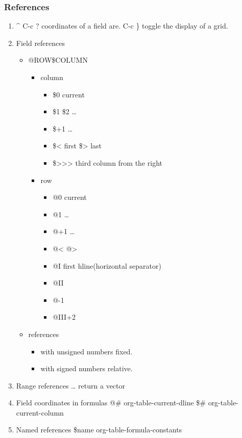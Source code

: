 \documentclass[11pt]{article}
\begin{document}
\subsubsection{References}
\label{sec:org9e89aeb}
\begin{enumerate}
\item \^{}
\label{sec:orgaf18a6f}
C-c ?  coordinates of a field are.
C-c \}  toggle the display of a grid.
\item Field references
\label{sec:org91fe00d}
\begin{itemize}
\item @ROW\$COLUMN
\begin{itemize}
\item column
\begin{itemize}
\item \$0 current
\item \$1 \$2 \ldots{}
\item \$+1 \ldots{}
\item \$< first \$> last
\item \$>>> third column from the right
\end{itemize}
\item row
\begin{itemize}
\item @0 current
\item @1 \ldots{}
\item @+1 \ldots{}
\item @< @>
\item @I first hline(horizontal separator)
\item @II
\item @-1
\item @III+2
\end{itemize}
\end{itemize}
\item references
\begin{itemize}
\item with unsigned numbers fixed.
\item with signed numbers relative.
\end{itemize}
\end{itemize}
\item Range references
\label{sec:org22d0ec9}
\ldots{}
return a vector
\item Field coordinates in formulas
\label{sec:org374a196}
@\# org-table-current-dline
\$\# org-table-current-column
\item Named references
\label{sec:org5c6cc54}
\$name
org-table-formula-constants


\end{enumerate}
\end{document}
